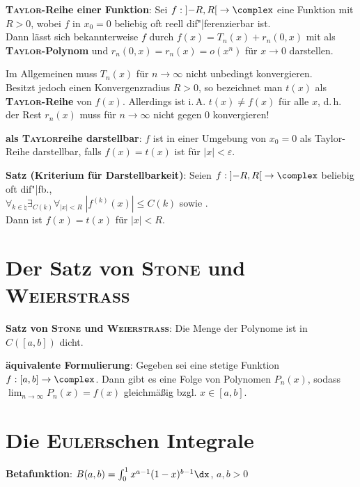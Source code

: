 \textbf{\textsc{Taylor}-Reihe einer Funktion}:
Sei $f: \left]-R,R\right[ \rightarrow \complex$ eine Funktion mit $R > 0$,
wobei $f$ in $x_0 = 0$ beliebig oft reell dif"|ferenzierbar ist. \\
Dann lässt sich bekannterweise $f$ durch $f(x) = T_n(x) + r_n(0, x)$
mit  als
\textbf{\textsc{Taylor}-Polynom} und $r_n(0, x) = r_n(x) = o(x^n)$ für
$x \to 0$ darstellen.

Im Allgemeinen muss $T_n(x)$ für $n \to \infty$ nicht unbedingt
konvergieren. \\
Besitzt jedoch  einen Konvergenzradius $R > 0$,
so bezeichnet man $t(x)$ als \textbf{\textsc{Taylor}-Reihe} von $f(x)$.
Allerdings ist i.\,A. $t(x) \not= f(x)$ für alle $x$, d.\,h.
der Rest $r_n(x)$ muss für $n \to \infty$ nicht gegen $0$ konvergieren!

\textbf{als \textsc{Taylor}reihe darstellbar}:
$f$ ist in einer Umgebung von $x_0 = 0$ als Taylor-Reihe darstellbar,
falls $f(x) = t(x)$ ist für $|x| < \varepsilon$.

\textbf{Satz (Kriterium für Darstellbarkeit)}:
Seien $f: \left]-R,R\right[ \rightarrow \complex$ beliebig oft dif"|fb., \\
$\forall_{k \in \natural} \exists_{C(k)} \forall_{|x| < R}\;
|f^{(k)}(x)| \le C(k)$ sowie
. \\
Dann ist $f(x) = t(x)$ für $|x| < R$.

\section{%
    Der Satz von \textsc{Stone} und \textsc{Weierstraß}%
}

\textbf{Satz von \textsc{Stone} und \textsc{Weierstraß}}:
Die Menge der Polynome ist in $C([a,b])$ dicht.

\textbf{äquivalente Formulierung}:
Gegeben sei eine stetige Funktion $f: [a,b] \rightarrow \complex$.
Dann gibt es eine Folge von Polynomen $P_n(x)$, sodass
$\lim_{n \to \infty} P_n(x) = f(x)$ gleichmäßig bzgl. $x \in [a,b]$.

\section{%
    Die \textsc{Euler}schen Integrale%
}

\textbf{Betafunktion}:
$B(a, b) = \int_0^1 x^{a-1} (1 - x)^{b-1} \dx$, $a, b > 0$

